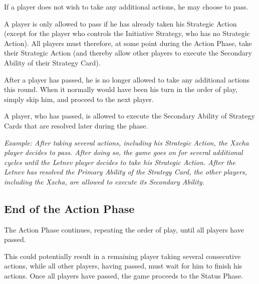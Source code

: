 \documentclass[11pt,fleqn]{book} %
\begin{document}
If a player does not wish to take any additional actions, he may choose to pass. 

A player is only allowed to pass if he has already taken his Strategic Action (except for the player who controls the Initiative Strategy, who has no Strategic Action). All players must therefore, at some point during the Action Phase, take their Strategic Action (and thereby allow other players to execute the Secondary Ability of their Strategy Card). 

After a player has passed, he is no longer allowed to take any additional actions this round. 
When it normally would have been his turn in the order of play, simply skip him, and proceed to the next player.

\begin{STbox}
    A player, who has passed, is allowed to execute the Secondary Ability of Strategy Cards that are resolved later during the phase.

    \emph{Example: After taking several actions, including his Strategic Action, the Xxcha player decides to pass. After doing so, the game goes on for several additional cycles until the Letnev player decides to take his Strategic Action. 
    After the Letnev has resolved the Primary Ability of the Strategy Card, the other players, including the Xxcha, are allowed to execute its Secondary Ability.}
\end{STbox}

\subsection{End of the Action Phase} %
\label{sub:end_of_the_action_phase}

The Action Phase continues, repeating the order of play, until all players have passed. 

This could potentially result in a remaining player taking several consecutive actions, while all other players, having passed, must wait for him to finish his actions. Once all players have passed, the game proceeds to the Status Phase.
\end{document}
